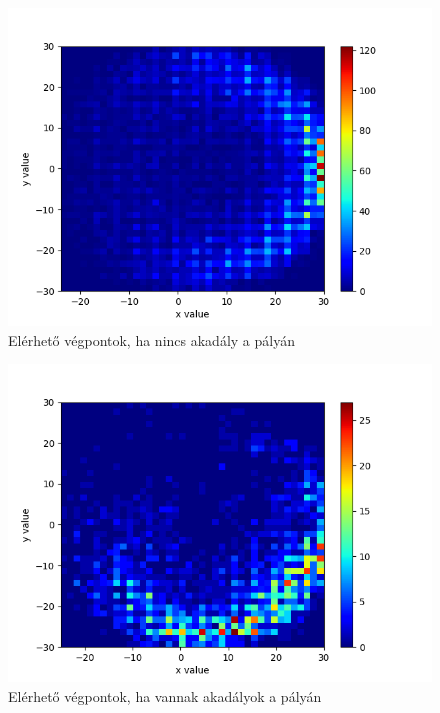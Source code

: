 \begin{figure}[h!]
\centering
\includegraphics[scale=0.75]{images/no_obstacles_histogram2d.png}
\caption{Elérhető végpontok, ha nincs akadály a pályán}
\label{fig:no_obstacles_histogram2d}
\end{figure}

\begin{figure}[h!]
\centering
\includegraphics[scale=0.75]{images/obstacles_histogram2d.png}
\caption{Elérhető végpontok, ha vannak akadályok a pályán}
\label{fig:obstacles_histogram2d}
\end{figure}



